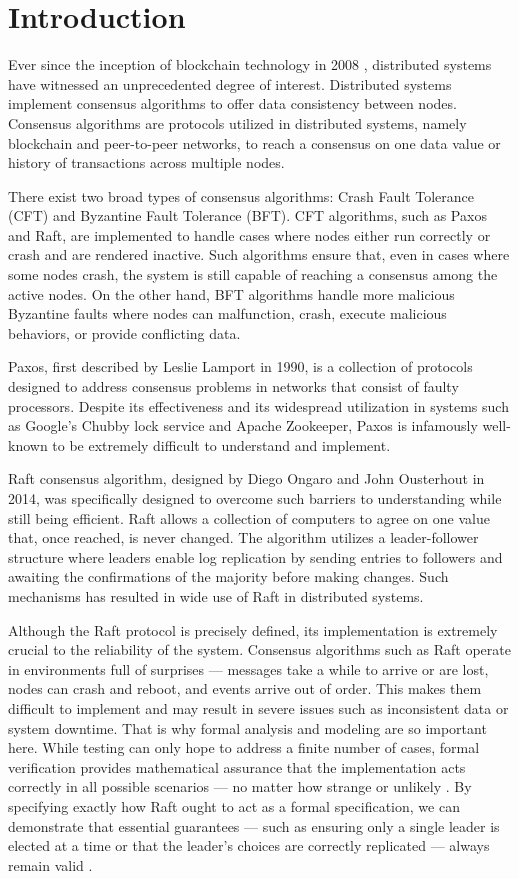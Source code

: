 \documentclass[a4paper]{llncs}
\begin{document}
    \section{Introduction}
    Ever since the inception of blockchain technology in 2008 \cite{Nakamoto}, distributed systems have witnessed an unprecedented degree of interest. Distributed systems implement consensus algorithms to offer data consistency between nodes. Consensus algorithms are protocols utilized in distributed systems, namely blockchain and peer-to-peer networks, to reach a consensus on one data value or history of transactions across multiple nodes. 

    There exist two broad types of consensus algorithms: Crash Fault Tolerance (CFT) and Byzantine Fault Tolerance (BFT)\cite{Qx6}. CFT algorithms, such as Paxos and Raft, are implemented to handle cases where nodes either run correctly or crash and are rendered inactive. Such algorithms ensure that, even in cases where some nodes crash, the system is still capable of reaching a consensus among the active nodes. On the other hand, BFT algorithms handle more malicious Byzantine faults where nodes can malfunction, crash, execute malicious behaviors, or provide conflicting data. 

    Paxos, first described by Leslie Lamport in 1990, is a collection of protocols designed to address consensus problems in networks that consist of faulty processors. Despite its effectiveness and its widespread utilization in systems such as Google's Chubby lock service and Apache Zookeeper, Paxos is infamously well-known to be extremely difficult to understand and implement. 

    Raft consensus algorithm, designed by Diego Ongaro and John Ousterhout in 2014\cite{Qx1}, was specifically designed to overcome such barriers to understanding while still being efficient. Raft allows a collection of computers to agree on one value that, once reached, is never changed. The algorithm utilizes a leader-follower structure where leaders enable log replication by sending entries to followers and awaiting the confirmations of the majority before making changes. Such mechanisms has resulted in wide use of Raft in distributed systems.  

Although the Raft protocol is precisely defined, its implementation is extremely crucial to the reliability of the system. Consensus algorithms such as Raft operate in environments full of surprises — messages take a while to arrive or are lost, nodes can crash and reboot, and events arrive out of order. This makes them difficult to implement and may result in severe issues such as inconsistent data or system downtime. That is why formal analysis and modeling are so important here. While testing can only hope to address a finite number of cases, formal verification provides mathematical assurance that the implementation acts correctly in all possible scenarios — no matter how strange or unlikely \cite{Clarke}. By specifying exactly how Raft ought to act as a formal specification, we can demonstrate that essential guarantees — such as ensuring only a single leader is elected at a time or that the leader's choices are correctly replicated — always remain valid \cite{Baier}.
\end{document}
